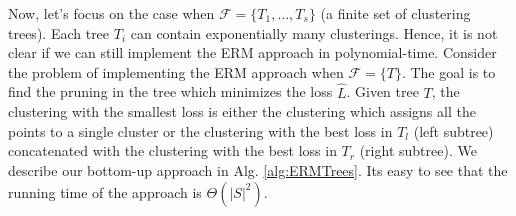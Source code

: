 \documentclass[12pt]{article}
\newcommand{\mc}{\mathcal}
\begin{document}
Now, let's focus on the case when $\mc F = \{T_1, \ldots, T_s\}$ (a finite set of clustering trees). Each tree $T_i$ can contain exponentially many clusterings. Hence, it is not clear if we can still implement the ERM approach in polynomial-time. Consider the problem of implementing the ERM approach when $\mc F = \{T\}$. The goal is to find the pruning in the tree which minimizes the loss $\hat L$. Given tree $T$, the clustering with the smallest loss is either the clustering which assigns all the points to a single cluster or the clustering with the best loss in $T_l$ (left subtree) concatenated with the clustering with the best loss in $T_r$ (right subtree). We describe our bottom-up approach in Alg. \ref{alg:ERMTrees}. Its easy to see that the running time of the approach is $\Theta(|S|^2)$. 


\ifdefined\COMPLETE
\else
\end{document}
